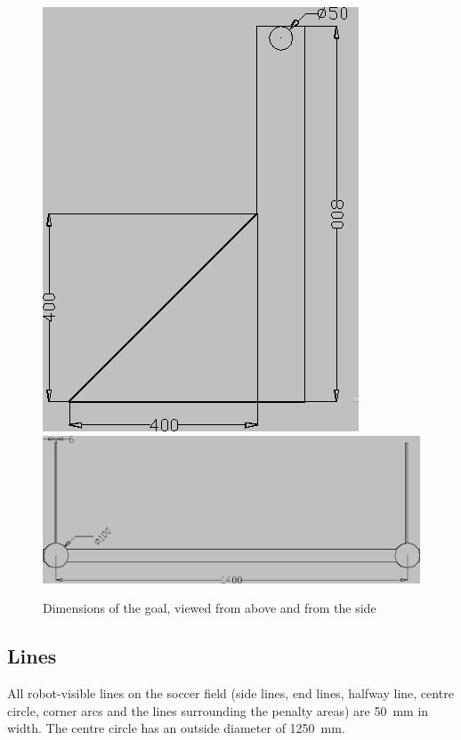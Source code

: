 \documentclass[12pt]{article}
\begin{document}




\begin{figure}[htp]
\begin{center}
    \leavevmode
    \includegraphics[width=0.4\columnwidth]{figs/goal_with_dims_left.png}\\
    \vspace{10pt}
    \includegraphics[width=0.8\columnwidth]{figs/goal_with_dims_top.png}
    \caption{Dimensions of the goal, viewed from above and from the side}
    \label{fig:goal_dimensions}
\end{center}
\end{figure}

\subsection{Lines}\label{sec:field_lines}

All robot-visible lines on the soccer field (side lines, end
lines, halfway line, centre circle, corner arcs and the lines surrounding the
penalty areas) are 50~mm in width. The centre circle has an outside diameter of 1250~mm.
\end{document}
